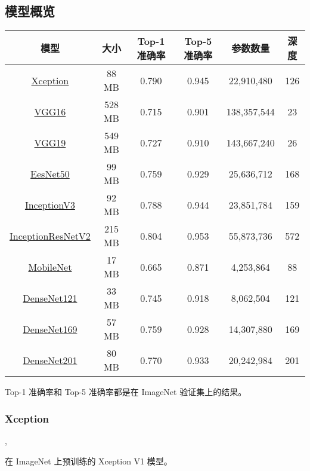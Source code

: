 \newpage
\subsection{模型概览}

\begin{longtable}[c]{cccccc}
\toprule
模型 & 大小 & Top-1 准确率 & Top-5 准确率 & 参数数量 &
深度\tabularnewline
\midrule
\endhead
\hyperref[xception]{Xception} & 88 MB & 0.790 & 0.945 & 22,910,480 &
126\tabularnewline
\hyperref[vgg16]{VGG16} & 528 MB & 0.715 & 0.901 & 138,357,544 &
23\tabularnewline
\hyperref[vgg19]{VGG19} & 549 MB & 0.727 & 0.910 & 143,667,240 &
26\tabularnewline
\hyperref[resnet50]{EesNet50} & 99 MB & 0.759 & 0.929 & 25,636,712 &
168\tabularnewline
\hyperref[inceptionv3]{InceptionV3} & 92 MB & 0.788 & 0.944 & 23,851,784 &
159\tabularnewline
\hyperref[inceptionresnetv2]{InceptionResNetV2} & 215 MB & 0.804 & 0.953 & 55,873,736 &
572\tabularnewline
\hyperref[mobilenet]{MobileNet} & 17 MB & 0.665 & 0.871 & 4,253,864 &
88\tabularnewline
\hyperref[densenet]{DenseNet121} & 33 MB & 0.745 & 0.918 & 8,062,504 &
121\tabularnewline
\hyperref[densenet]{DenseNet169} & 57 MB & 0.759 & 0.928 & 14,307,880 &
169\tabularnewline
\hyperref[densenet]{DenseNet201} & 80 MB & 0.770 & 0.933 & 20,242,984 &
201\tabularnewline
\bottomrule
\end{longtable}

Top-1 准确率和 Top-5 准确率都是在 ImageNet 验证集上的结果。



\subsubsection{Xception}\label{xception}

\begin{Shaded}
\begin{Highlighting}[]
\OperatorTok{=}\OperatorTok{=}, \\
\hspace{3cm}\OperatorTok{=}\OperatorTok{=}\OperatorTok{=}\OperatorTok{=}\NormalTok{)}
\end{Highlighting}
\end{Shaded}

在 ImageNet 上预训练的 Xception V1 模型。


